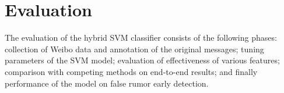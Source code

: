 \section{Evaluation}
\label{sec:exper}
The evaluation of the hybrid SVM classifier consists of the following phases:
collection of Weibo data and annotation of the original messages;
tuning parameters of the SVM model; evaluation of effectiveness of
various features; comparison with competing methods on
end-to-end results; and finally performance of the model on false rumor
early detection.






